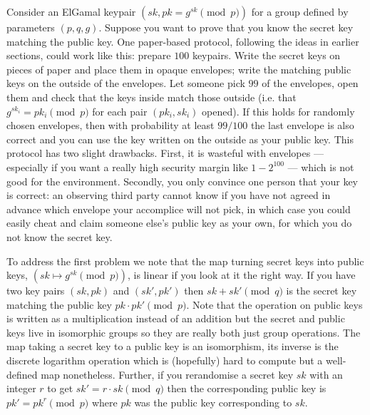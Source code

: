 \documentclass[envcountsame]{llncs}
\begin{document}
Consider an ElGamal keypair $(sk, pk = g^{sk} \pmod{p})$ for a group defined by
parameters $(p, q, g)$. Suppose you want to prove that you know the secret key
matching the public key. One paper-based protocol, following the ideas in
earlier sections, could work like this: prepare $100$ keypairs. Write the secret
keys on pieces of paper and place them in opaque envelopes; write the matching
public keys on the outside of the envelopes. Let someone pick $99$ of the
envelopes, open them and check that the keys inside match those outside (i.e.
that $g^{sk_i} = pk_i \pmod{p}$ for each pair $(pk_i, sk_i)$ opened). If this
holds for randomly chosen envelopes, then with probability at least $99/100$ the
last envelope is also correct and you can use the key written on the outside as
your public key. This protocol has two slight drawbacks. First, it is wasteful
with envelopes --- especially if you want a really high security margin like
$1 - 2^{100}$ --- which is not good for the environment. Secondly, you only
convince one person that your key is correct: an observing third party cannot
know if you have not agreed in advance which envelope your accomplice will not
pick, in which case you could easily cheat and claim someone else's public key
as your own, for which you do not know the secret key.

To address the first problem we note that the map turning secret keys into
public keys, $(sk \mapsto g^{sk} \pmod{p})$, is linear if you look at it the
right way. If you have two key pairs $(sk, pk)$ and $(sk', pk')$ then $sk + sk'
\pmod{q}$ is the secret key matching the public key $pk \cdot pk' \pmod{p}$.
Note that the operation on public keys is written as a multiplication instead of
an addition but the secret and public keys live in isomorphic groups so they are
really both just group operations. The map taking a secret key to a public key
is an isomorphism, its inverse is the discrete logarithm operation which is
(hopefully) hard to compute but a well-defined map nonetheless. Further, if you
rerandomise a secret key $sk$ with an integer $r$ to get $sk' = r \cdot sk
\pmod{q}$ then the corresponding public key is $pk' = pk^r \pmod{p}$ where $pk$
was the public key corresponding to $sk$.
\end{document}
